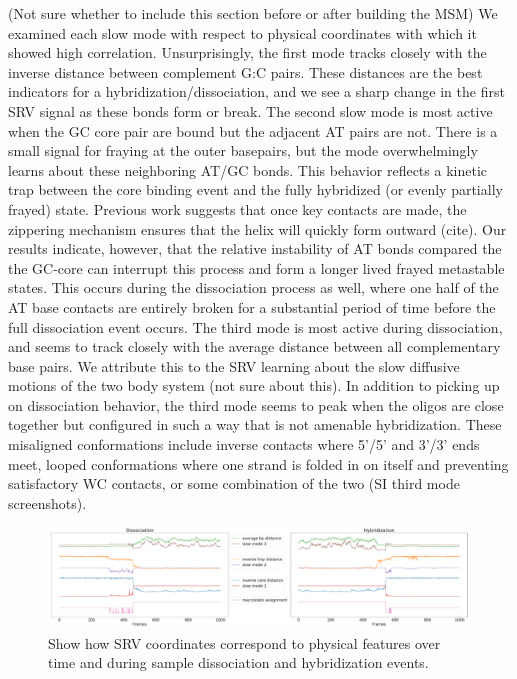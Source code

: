 \documentclass[journal=jpcbfk,manuscript=article]{achemso}
\begin{document}
(Not sure whether to include this section before or after building the MSM)
We examined each slow mode with respect to physical coordinates with which it showed high correlation. Unsurprisingly, the first mode tracks closely with the inverse distance between complement G:C pairs. These distances are the best indicators for a hybridization/dissociation, and we see a sharp change in the first SRV signal as these bonds form or break. The second slow mode is most active when the GC core pair are bound but the adjacent AT pairs are not. There is a small signal for fraying at the outer basepairs, but the mode overwhelmingly learns about these neighboring AT/GC bonds. This behavior reflects a kinetic trap between the core binding event and the fully hybridized (or evenly partially frayed) state. Previous work suggests that once key contacts are made, the zippering mechanism ensures that the helix will quickly form outward (cite). Our results indicate, however, that the relative instability of AT bonds compared the the GC-core can interrupt this process and form a longer lived frayed metastable states. This occurs during the dissociation process as well, where one half of the AT base contacts are entirely broken for a substantial period of time before the full dissociation event occurs. The third mode is most active during dissociation, and seems to track closely with the average distance between all complementary base pairs. We attribute this to the SRV learning about the slow diffusive motions of the two body system (not sure about this). In addition to picking up on dissociation behavior, the third mode seems to peak when the oligos are close together but configured in such a way that is not amenable hybridization. These misaligned conformations include inverse contacts where 5'/5' and 3'/3' ends meet, looped conformations where one strand is folded in on itself and preventing satisfactory WC contacts, or some combination of the two (SI third mode screenshots).

\begin{figure}[ht!]
	\begin{center}
        \includegraphics[width=\textwidth]{Figs/figs_0804/GC-core_tracking_modes.png}
        \caption{Show how SRV coordinates correspond to physical features over time and during sample dissociation and hybridization events.}
        \label{fig:GC-core_tracking_modes}
	\end{center}
\end{figure}
\end{document}
